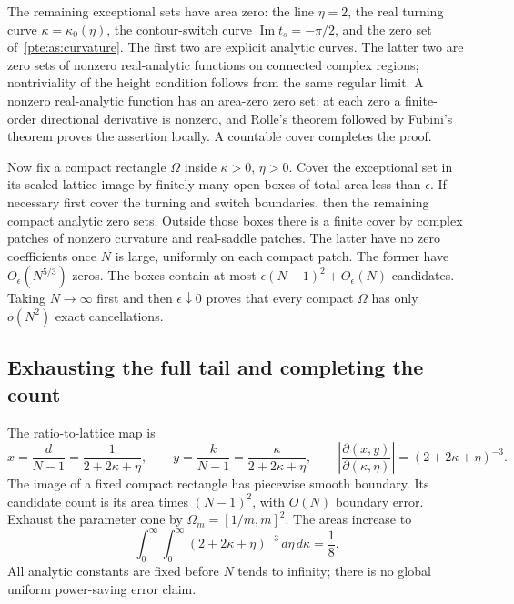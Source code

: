 \documentclass[11pt,a4paper]{article}
\numberwithin{equation}{section}
\theoremstyle{definition}
\theoremstyle{plain}
\begin{document}
The remaining exceptional sets have area zero: the line $\eta=2$, the real turning curve $\kappa=\kappa_0(\eta)$, the contour-switch curve $\operatorname{Im}t_s=-\pi/2$, and the zero set of~\eqref{pte:as:curvature}. The first two are explicit analytic curves. The latter two are zero sets of nonzero real-analytic functions on connected complex regions; nontriviality of the height condition follows from the same regular limit. A nonzero real-analytic function has an area-zero zero set: at each zero a finite-order directional derivative is nonzero, and Rolle's theorem followed by Fubini's theorem proves the assertion locally. A countable cover completes the proof.

Now fix a compact rectangle $\Omega$ inside $\kappa>0$, $\eta>0$. Cover the exceptional set in its scaled lattice image by finitely many open boxes of total area less than $\epsilon$. If necessary first cover the turning and switch boundaries, then the remaining compact analytic zero sets. Outside those boxes there is a finite cover by complex patches of nonzero curvature and real-saddle patches. The latter have no zero coefficients once $N$ is large, uniformly on each compact patch. The former have $O_\epsilon(N^{5/3})$ zeros. The boxes contain at most $\epsilon(N-1)^2+O_\epsilon(N)$ candidates. Taking $N\to\infty$ first and then $\epsilon\downarrow0$ proves that every compact $\Omega$ has only $o(N^2)$ exact cancellations.

\subsection{Exhausting the full tail and completing the count}
The ratio-to-lattice map is
\begin{equation}\label{pte:as:Jacobian}
 x=\frac d{N-1}=\frac1{2+2\kappa+\eta},\qquad
 y=\frac k{N-1}=\frac\kappa{2+2\kappa+\eta},\qquad
 \left|\frac{\partial(x,y)}{\partial(\kappa,\eta)}\right|
 =(2+2\kappa+\eta)^{-3}.
\end{equation}
The image of a fixed compact rectangle has piecewise smooth boundary. Its candidate count is its area times $(N-1)^2$, with $O(N)$ boundary error. Exhaust the parameter cone by $\Omega_m=[1/m,m]^2$. The areas increase to
\begin{equation}\label{pte:as:tailarea}
 \int_0^\infty\int_0^\infty
       (2+2\kappa+\eta)^{-3}\,d\eta\,d\kappa=\frac18.
\end{equation}
All analytic constants are fixed before $N$ tends to infinity; there is no global uniform power-saving error claim.
\end{document}

